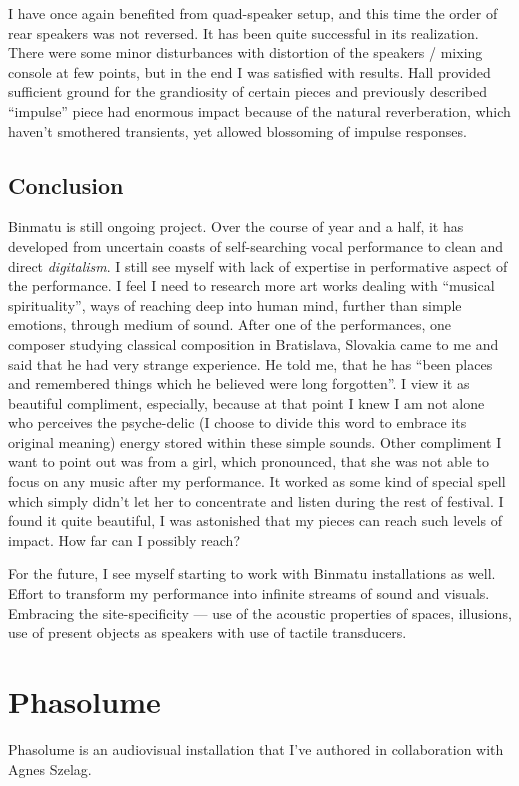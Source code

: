 \documentclass[12pt,a4paper,oneside]{report}
\begin{document}
I have once again benefited from quad-speaker setup, and this time the order of rear speakers was not reversed. It has been quite successful in its realization. There were some minor disturbances with distortion of the speakers / mixing console at few points, but in the end I was satisfied with results. Hall provided sufficient ground for the grandiosity of certain pieces and previously described ``impulse'' piece had enormous impact because of the natural reverberation, which haven't smothered transients, yet allowed blossoming of impulse responses.

\subsection{Conclusion} Binmatu is still ongoing project. Over the course of year and a half, it has developed from uncertain coasts of self-searching vocal performance to clean and direct \emph{digitalism}. I still see myself with lack of expertise in performative aspect of the performance. I feel I need to research more art works dealing with ``musical spirituality'', ways of reaching deep into human mind, further than simple emotions, through medium of sound. After one of the performances, one composer studying classical composition in Bratislava, Slovakia came to me and said that he had very strange experience. He told me, that he has ``been places and remembered things which he believed were long forgotten''. I view it as beautiful compliment, especially, because at that point I knew I am not alone who perceives the psyche-delic (I choose to divide this word to embrace its original meaning) energy stored within these simple sounds. Other compliment I want to point out was from a girl, which pronounced, that she was not able to focus on any music after my performance. It worked as some kind of special spell which simply didn't let her to concentrate and listen during the rest of festival. I found it quite beautiful, I was astonished that my pieces can reach such levels of impact. How far can I possibly reach?

For the future, I see myself starting to work with Binmatu installations as well. Effort to transform my performance into infinite streams of sound and visuals. Embracing the site-specificity --- use of the acoustic properties of spaces, illusions, use of present objects as speakers with use of tactile transducers.

\clearpage
\section{Phasolume} Phasolume is an audiovisual installation that I've authored in collaboration with Agnes Szelag.
\end{document}
